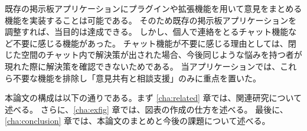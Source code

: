 \documentclass[main]{subfiles}
\begin{document}
既存の掲示板アプリケーションにプラグインや拡張機能を用いて意見をまとめる機能を実装することは可能である。
そのため既存の掲示板アプリケーションを調整すれば、当目的は達成できる。
しかし、個人で連絡をとるチャット機能など不要に感じる機能があった。%
チャット機能が不要に感じる理由としては、閉じた空間のチャット内で解決策が出された場合、今後同じような悩みを持つ者が現れた際に解決策を確認できないためである。
当アプリケーションでは、これら不要な機能を排除し「意見共有と相談支援」のみに重点を置いた。

本論文の構成は以下の通りである。まず \ref{cha:related} 章では、関連研究について述べる。
さらに、\ref{cha:exfig} 章では、図表の作成の仕方を述べる。
最後に、\ref{cha:conclusion} 章では、本論文のまとめと今後の課題について述べる。
\end{document}
